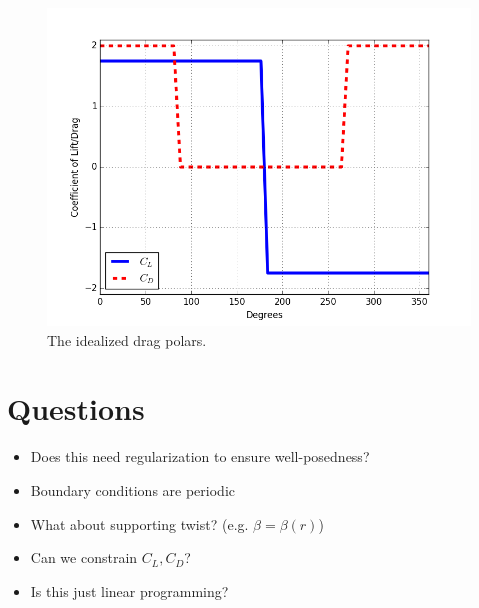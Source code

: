 \documentclass{article}
\begin{document}
\begin{figure}[!htb]
  \begin{center}
    \includegraphics[width = 12 cm]{figs/drags}
    \caption{The idealized drag polars.} 
    \label{drags}
  \end{center}
\end{figure}


\newpage
\section{Questions}

\begin{itemize}
 \item Does this need regularization to ensure well-posedness?
 \item Boundary conditions are periodic
 \item What about supporting twist? (e.g. $\beta = \beta(r)$)
 \item Can we constrain $C_L, C_D$?
 \item Is this just linear programming?
\end{itemize}
\end{document}
